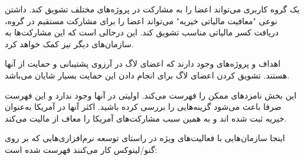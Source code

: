 یک گروه کاربری می‌تواند اعضا را به مشارکت در پروژه‌های مختلف تشویق کند.
داشتن نوعی "معافیت مالیاتی خیریه" می‌تواند اعضا را برای مشارکت مستقیم در گروه،
دریافت کسر مالیاتی مناسب تشویق کند. این درحالی است که این مشارکت‌ها
به سازمان‌های دیگر نیز کمک خواهد کرد.

اهداف و پروژه‌های وجود دارند که اعضای لاگ در آرزوی پشتیبانی و حمایت از آنها هستند.
تشویق کردن اعضای لاگ برای انجام دادن این حمایت بسیار شایان می‌باشد.

این بخش نامزد‌های ممکن را فهرست می‌کند. اولیتی در آنها وجود ندارد و این فهرست
صرفا باعث می‌شود گزینه‌هایی را بررسی کرده باشید. اکثر آنها در آمریکا به‌عنوان
خیریه ثبت شده اند و به همین سبب مشارکت‌های آمریکا را معاف از مالیت می‌کند.

اینجا سازمان‌هایی با فعالیت‌های ویژه در راستای توسعه نرم‌افزاری‌هایی که
بر روی گنو/لینوکس کار می‌کنند فهرست شده است:

